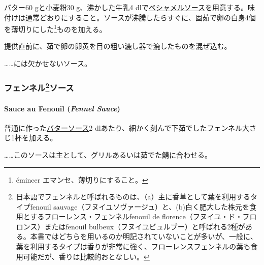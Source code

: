 \begin{recette}
バター60 gと小麦粉30 g、沸かした牛乳4
dlで\protect\hyperlink{sauce-bechamel}{ベシャメルソース}を用意する。味付けは通常どおりにすること。ソースが沸騰したらすぐに、固茹で卵の白身4個を薄切りにした\footnote{émincer
  エマンセ、薄切りにすること。}ものを加える。

提供直前に、茹で卵の卵黄を目の粗い漉し器で漉したものを混ぜ込む。

\ldots{}\ldots{}には欠かせないソース。

\maeaki

\hypertarget{ux30d5ux30a7ux30f3ux30cdux30eb30ux30bdux30fcux30b9}{%
\subsubsection[フェンネルソース]{\texorpdfstring{フェンネル\footnote{日本語でフェンネルと呼ばれるものは、（a）主に香草として葉を利用するタイプfenouil
  sauvage（フヌイユソヴァージュ）と、(b)白く肥大した株元を食用とするフローレンス・フェンネルfenouil
  de florence（フヌイユ・ド・フロロンス）またはfenouil
  bulbeux（フヌイユビュルブー）と呼ばれる2種がある。本書ではどちらを用いるのか明記されていないことが多いが、一般に、葉を利用するタイプは香りが非常に強く、フローレンスフェンネルの葉も食用可能だが、香りは比較的おとなしい。}ソース}{フェンネルソース}}\label{ux30d5ux30a7ux30f3ux30cdux30eb30ux30bdux30fcux30b9}}

\hypertarget{fennel-sauce}{%
\paragraph{\texorpdfstring{Sauce au Fenouil (\emph{Fennel
Sauce})}{Sauce au Fenouil (Fennel Sauce)}}\label{fennel-sauce}}


普通に作った\protect\hyperlink{butter-sauce}{バターソース}2\undemi{}
dlあたり、細かく刻んで下茹でしたフェンネル大さじ1杯を加える。

\ldots{}\ldots{}このソースは主として、グリルあるいは茹でた鯖に合わせる。


\end{recette}
